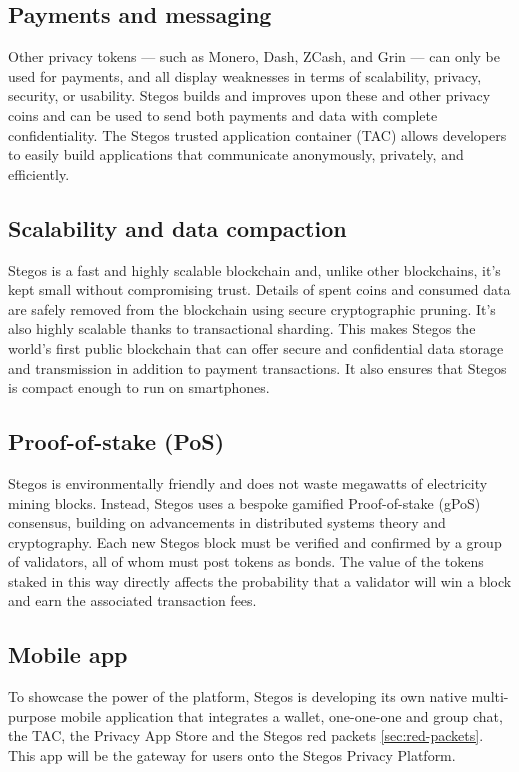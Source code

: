 \documentclass[8pt,fleqn,openany]{book}
\begin{document}
\subsection{Payments and messaging}
Other privacy tokens — such as Monero, Dash, ZCash, and Grin — can only be used for payments, and all display weaknesses in terms of scalability, privacy, security, or usability. Stegos builds and improves upon these and other privacy coins and can be used to send both payments and data with complete confidentiality. The Stegos trusted application container (TAC) allows developers to easily build applications that communicate anonymously, privately, and efficiently.

\subsection{Scalability and data compaction}
Stegos is a fast and highly scalable blockchain and, unlike other blockchains, it’s kept small without compromising trust. Details of spent coins and consumed data are safely removed from the blockchain using secure cryptographic pruning. It's also highly scalable thanks to transactional sharding. This makes Stegos the world’s first public blockchain that can offer secure and confidential data storage and transmission in addition to payment transactions. It also ensures that Stegos is compact enough to run on smartphones.

\subsection{Proof-of-stake (PoS)}
Stegos is environmentally friendly and does not waste megawatts of electricity mining blocks. Instead, Stegos uses a bespoke gamified Proof-of-stake (gPoS) consensus, building on advancements in distributed systems theory and cryptography. Each new Stegos block must be verified and confirmed by a group of validators, all of whom must post tokens as bonds. The value of the tokens staked in this way directly affects the probability that a validator will win a block and earn the associated transaction fees.

\subsection{Mobile app}
To showcase the power of the platform, Stegos is developing its own native multi-purpose mobile application that integrates a wallet, one-one-one and group chat, the TAC, the Privacy App Store and the Stegos red packets \ref{sec:red-packets}. This app will be the gateway for users onto the Stegos Privacy Platform.
\end{document}
